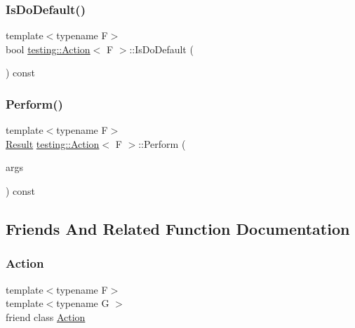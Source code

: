 \subsubsection{\texorpdfstring{IsDoDefault()}{IsDoDefault()}}
{\footnotesize\ttfamily template$<$typename F$>$ \\
bool \mbox{\hyperlink{classtesting_1_1Action}{testing\+::\+Action}}$<$ F $>$\+::Is\+Do\+Default (\begin{DoxyParamCaption}{ }\end{DoxyParamCaption}) const\hspace{0.3cm}{\ttfamily [inline]}}

\mbox{\label{classtesting_1_1Action_a5489a68def1d82eb61df819eae52dc8f}} 
\subsubsection{\texorpdfstring{Perform()}{Perform()}}
{\footnotesize\ttfamily template$<$typename F$>$ \\
\mbox{\hyperlink{classtesting_1_1Action_a9af08a21ad329331fde856cba9b6dea2}{Result}} \mbox{\hyperlink{classtesting_1_1Action}{testing\+::\+Action}}$<$ F $>$\+::Perform (\begin{DoxyParamCaption}\item[{\mbox{\hyperlink{classtesting_1_1Action_ae27fda510696a9294f991de5b1abfaf2}{Argument\+Tuple}}}]{args }\end{DoxyParamCaption}) const\hspace{0.3cm}{\ttfamily [inline]}}



\subsection{Friends And Related Function Documentation}
\mbox{\label{classtesting_1_1Action_a62bc48ff11968b6e45d21c4b49f349fb}} 
\subsubsection{\texorpdfstring{Action}{Action}}
{\footnotesize\ttfamily template$<$typename F$>$ \\
template$<$typename G $>$ \\
friend class \mbox{\hyperlink{classtesting_1_1Action}{Action}}\hspace{0.3cm}{\ttfamily [friend]}}

